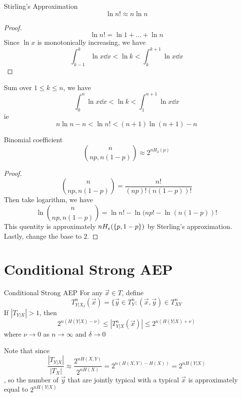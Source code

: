 \documentclass[../main.tex]{subfiles}
\begin{document}
\begin{bbox}{Stirling's Approximation}
    \[
    \ln n! \approx n\ln n
    \]
    \begin{proof}
        \[
        \ln n!=\ln 1+\dots+\ln n
        \]
        Since $\ln x$ is monotonically increasing, we have \[
        \int_{k-1}^k
\ln x \dd x < \ln k <  \int_{k}^{k+1}
\ln x \dd x\]
    \end{proof}
Sum over $1\leq k\leq n$, we have \[
        \int_{0}^n
\ln x \dd x < \ln k <  \int_{1}^{n+1}
\ln x \dd x\]
ie \[
n\ln n-n< \ln n!<(n+1)\ln (n+1)-n
\]
\end{bbox}
\begin{bbox}{Binomial coefficient}
    \[
    \binom{n}{np,n(1-p)}\approx 2^{n H_2(p)}
    \]
    \begin{proof}
        \[
        \binom{n}{np,n(1-p)} = \frac{n!}{(np)!(n(1-p))!}
        \]
        Then take logarithm, we have \[
        \ln \binom{n}{np,n(1-p)} = \ln n!-\ln (np!-\ln (n(1-p))!
        \]
        This quentity is approximately $n H_e(\{p,1-p\})$ by Sterling's approximation. Lastly, change the base to $2$.
    \end{proof}
\end{bbox}

\section{Conditional Strong AEP}
\begin{bbox}{Conditional Strong AEP}
For any $\vec x \in T$, define \[
T^n_{Y|X_\delta}(\vec x) = \{\vec y\in T^n_{Y}:(\vec x, \vec y)\in T^n_{XY}
\]
If $|T_{Y|X}|>1$, then \[
2^{n(H(Y|X)-\nu)} \leq |T^n_{Y|X}(\vec x)| \leq 2^{n(H(Y|X)+\nu)}
\]
where $\nu\to 0$ as $n\to \infty$ and $\delta\to 0$
\end{bbox}
Note that since \[
\frac{|T_{Y|X}|}{|T_X|}\approx \frac{2^{nH(X,Y)}}{2^{nH(X)}} = 2^{n(H(X,Y)-H(X))}=2^{nH(Y|X)}
\], so the number of $\vec y$ that are jointly typical with a typical $\vec x$ is approximately equal to $2^{nH(Y|X)}$
\end{document}
